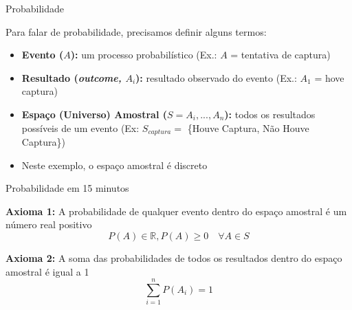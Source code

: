\documentclass{beamer}\usepackage[]{graphicx}\usepackage[]{color}
\begin{document}
\begin{frame}{Probabilidade}

Para falar de probabilidade, precisamos definir alguns termos:

\begin{itemize}
  \item \textbf{Evento ($A$):} um processo probabilístico (Ex.: $A$ = tentativa de captura) \pause
  \vfill
  \item \textbf{Resultado (\emph{outcome, $A_i$}): }resultado observado do evento (Ex.: $A_1$ = hove captura) \pause
  \vfill
  \item \textbf{Espaço (Universo) Amostral ($S = A_i,...,A_n$):} todos os resultados possíveis de um evento (Ex: $S_{captura} =$ \{Houve Captura, Não Houve Captura\}) \pause
  \vfill
    \item Neste exemplo, o espaço amostral é discreto
    
\end{itemize}


\end{frame} 


\begin{frame}{Probabilidade em 15 minutos}

\textbf{Axioma 1:}
A probabilidade de qualquer evento dentro do espaço amostral é um número real positivo
\begin{equation*}
    P(A) \in \mathbb{R}, P(A) \geq 0  \quad \forall A \in S
\end{equation*}

\textbf{Axioma 2:}
A soma das probabilidades de todos os resultados dentro do espaço amostral é igual a 1
\begin{equation*}
    \sum_{i=1}^{n}{P(A_i)= 1}
\end{equation*}

\end{frame} 
\end{document}
